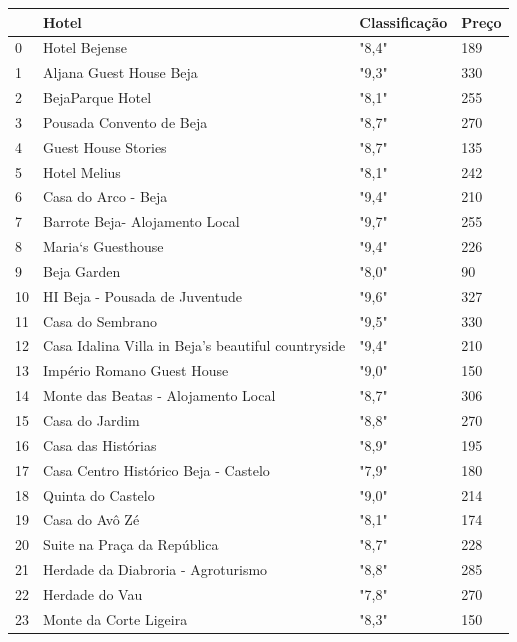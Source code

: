 \documentclass[a4paper,10pt]{article}
\begin{document}
\begin{table}[!ht]
  \centering
  \begin{tabular}{|l|l|l|l|}
  \hline
      ~ & Hotel & Classificação & Preço \\ \hline
      0 & Hotel Bejense & "8,4" & 189 \\ \hline
      1 & Aljana Guest House Beja & "9,3" & 330 \\ \hline
      2 & BejaParque Hotel & "8,1" & 255 \\ \hline
      3 & Pousada Convento de Beja & "8,7" & 270 \\ \hline
      4 & Guest House Stories & "8,7" & 135 \\ \hline
      5 & Hotel Melius & "8,1" & 242 \\ \hline
      6 & Casa do Arco - Beja & "9,4" & 210 \\ \hline
      7 & Barrote Beja- Alojamento Local & "9,7" & 255 \\ \hline
      8 & Maria`s Guesthouse & "9,4" & 226 \\ \hline
      9 & Beja Garden & "8,0" & 90 \\ \hline
      10 & HI Beja - Pousada de Juventude & "9,6" & 327 \\ \hline
      11 & Casa do Sembrano & "9,5" & 330 \\ \hline
      12 & Casa Idalina Villa in Beja's beautiful countryside & "9,4" & 210 \\ \hline
      13 & Império Romano Guest House & "9,0" & 150 \\ \hline
      14 & Monte das Beatas - Alojamento Local & "8,7" & 306 \\ \hline
      15 & Casa do Jardim & "8,8" & 270 \\ \hline
      16 & Casa das Histórias & "8,9" & 195 \\ \hline
      17 & Casa Centro Histórico Beja - Castelo & "7,9" & 180 \\ \hline
      18 & Quinta do Castelo & "9,0" & 214 \\ \hline
      19 & Casa do Avô Zé & "8,1" & 174 \\ \hline
      20 & Suite na Praça da República & "8,7" & 228 \\ \hline
      21 & Herdade da Diabroria - Agroturismo & "8,8" & 285 \\ \hline
      22 & Herdade do Vau & "7,8" & 270 \\ \hline
      23 & Monte da Corte Ligeira & "8,3" & 150 \\ \hline
  \end{tabular}
\end{table}
\end{document}
